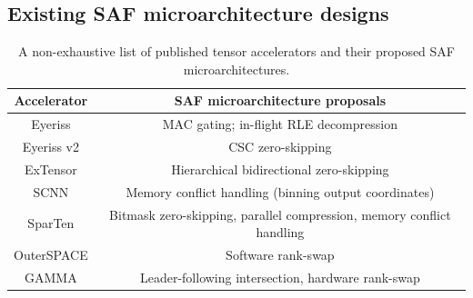 \subsection{Existing SAF microarchitecture designs}

%
%
\begin{table}[ht]
\begin{tabular}{c|c|}
\textbf{Accelerator} & \textbf{SAF microarchitecture proposals} \\ \hline \hline
Eyeriss &  MAC gating; in-flight RLE decompression \\ \hline
Eyeriss v2 & CSC zero-skipping \\ \hline
ExTensor & Hierarchical bidirectional zero-skipping \\ \hline
SCNN & Memory conflict handling (binning output coordinates) \\ \hline
SparTen & Bitmask zero-skipping, parallel compression, memory conflict handling \\ \hline
OuterSPACE & Software rank-swap \\ \hline
GAMMA & Leader-following intersection, hardware rank-swap \\ \hline
\end{tabular}
\caption{A non-exhaustive list of published tensor accelerators and their proposed SAF microarchitectures.}
\label{tab:design_specific_models}
\centering
\end{table}

